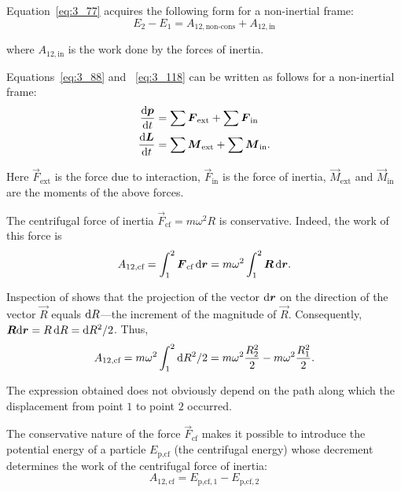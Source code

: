 \begin{figure}[t]
\begin{minipage}[t]{0.5\linewidth}
\begin{center}
			\caption[]{}
			\label{fig:4_12}
		\end{center}
	\end{minipage}
	\vspace{-0.45cm}
\end{figure}

Equation~\eqref{eq:3_77} acquires the following form for a non-inertial frame:
\begin{equation}\label{eq:4_26}
E_2-E_1 = A_{12,\text{non-cons}} + A_{12,\text{in}}
\end{equation}

\noindent
where $A_{12,\text{in}}$ is the work done by the forces of inertia.

Equations~\eqref{eq:3_88} and ~\eqref{eq:3_118} can be written as follows for a non-inertial frame:
\begin{align}
\frac{\mathrm{d}\boldsymbol{p}}{\mathrm{d} t} &= \sum\boldsymbol{F}_{\text{ext}} + \sum\boldsymbol{F}_{\text{in}}\label{eq:4_27}\\
\frac{\mathrm{d}\boldsymbol{L}}{\mathrm{d} t} &= \sum\boldsymbol{M}_{\text{ext}} + \sum\boldsymbol{M}_{\text{in}}\label{eq:4_28}.
\end{align}

Here $\vec{F}_{\text{ext}}$ is the force due to interaction, $\vec{F}_{\text{in}}$ is the force of inertia, $\vec{M}_{\text{ext}}$ and $\vec{M}_{\text{in}}$ are the moments of the above forces.

The centrifugal force of inertia $\vec{F}_{\text{cf}}=m\omega^2 R$ is conservative. Indeed, the work of this force is
\begin{equation*}
A_{12,\text{cf}} = \int_1^2\boldsymbol{F}_{\text{cf}}\,\mathrm{d}\boldsymbol{r} = m\omega^2\int_{1}^{2}\boldsymbol{R}\,\mathrm{d}\boldsymbol{r}.
\end{equation*}

\noindent
Inspection of  shows that the projection of the vector $\mathrm{d}\boldsymbol{r}$ on the direction of the vector $\vec{R}$ equals $\mathrm{d} R$---the increment of the magnitude of $\vec{R}$. Consequently, $\boldsymbol{R}\mathrm{d}\boldsymbol{r}=R\,\mathrm{d} R = \mathrm{d} R^2/2$. Thus,
\begin{equation}\label{eq:4_29}
A_{12,\text{cf}} = m\omega^2 \int_{1}^{2} \mathrm{d} R^2/2 = m\omega^2 \frac{R^2_2}{2} - m\omega^2 \frac{R^2_1}{2}.
\end{equation}

\noindent
The expression obtained does not obviously depend on the path along which the displacement from point $1$ to point $2$ occurred.

The conservative nature of the force $\vec{F}_{\text{cf}}$ makes it possible to introduce the potential energy of a particle $E_{\text{p,cf}}$ (the centrifugal energy) whose decrement determines the work of the centrifugal force of inertia:
\begin{equation}\label{eq:4_30}
A_{12,\text{cf}} = E_{\text{p,cf},1} - E_{\text{p,cf},2}
\end{equation}

